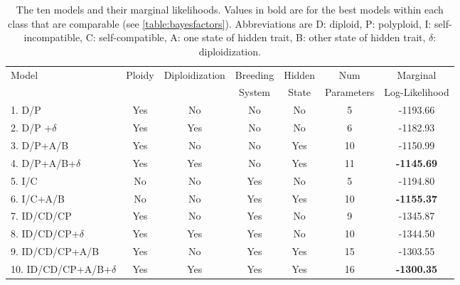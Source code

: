 \begin{table}
\begin{tabular}{lcccccc} \toprule
Model                     & Ploidy & Diploidization & Breeding  & Hidden & Num        & Marginal       \\
                          &        &                & System    & State  & Parameters & Log-Likelihood \\ \midrule
1. D/P                    & Yes    & No             & No        & No     & 5          & -1193.66\\
2. D/P +$\delta$          & Yes    & Yes            & No        & No     & 6          & -1182.93 \\
3. D/P+A/B                & Yes    & No             & No        & Yes    & 10         & -1150.99\\
4. D/P+A/B+$\delta$       & Yes    & Yes            & No        & Yes    & 11         & \textbf{-1145.69}\\
5. I/C                    & No     & No             & Yes       & No     & 5          & -1194.80 \\
6. I/C+A/B                & No     & No             & Yes       & Yes    & 10         & \textbf{-1155.37}\\
7. ID/CD/CP               & Yes    & No             & Yes       & No     & 9          & -1345.87\\
8. ID/CD/CP+$\delta$      & Yes    & Yes            & Yes       & No     & 10         & -1344.50\\
9. ID/CD/CP+A/B           & Yes    & No             & Yes       & Yes    & 15         & -1303.55 \\ 
10. ID/CD/CP+A/B+$\delta$ & Yes    & Yes            & Yes       & Yes    & 16         & \textbf{-1300.35} \\
\bottomrule
\end{tabular}
\caption{
    The ten models and their marginal likelihoods.
    Values in bold are for the best models within each class that are comparable (see \cref{table:bayesfactors}).
    Abbreviations are D: diploid, P: polyploid, I: self-incompatible, C: self-compatible, A: one state of hidden trait, B: other state of hidden trait, $\delta$: diploidization.}
\label{table:marginallike}
\end{table}

